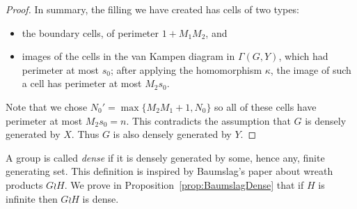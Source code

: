 \documentclass[11pt]{amsart}
\theoremstyle{definition}
\begin{document}
\begin{proof}
In summary, the filling we have created has cells of two types:
\begin{itemize}
    \item the boundary cells, of perimeter $1+M_1M_2$, and
    \item images of the cells in the van Kampen diagram in $\Gamma(G,Y)$, which had perimeter at most $s_0$; after applying the homomorphism $\kappa$, the image of such a cell has perimeter at most $M_2s_0$.
\end{itemize}




Note that we chose $N_0'=\max\{M_2M_1+1,N_0\}$ so all of these cells have perimeter at most $M_2s_0=n$.
This contradicts the assumption that $G$ is densely generated by $X$.  Thus $G$ is also densely generated by $Y$.
\end{proof}





A group is called {\em dense} if it is densely generated by some, hence any, finite generating set.
This definition is inspired by  Baumslag's paper \cite{baumslag61} about wreath products $G\wr H$.
We prove in Proposition~\ref{prop:BaumslagDense} that if $H$ is infinite then $G\wr H$ is  dense.
\end{document}
